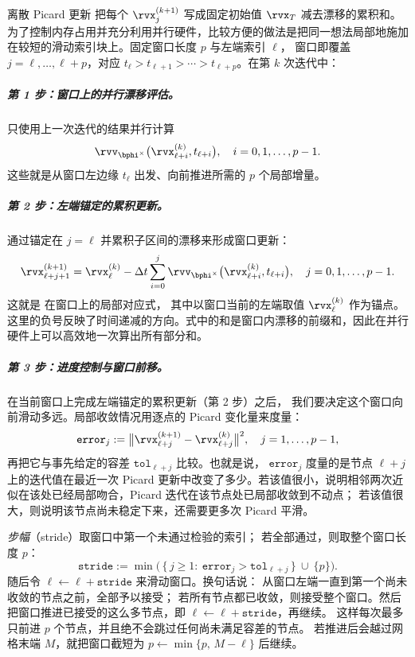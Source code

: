 离散 Picard 更新  把每个
$\rvx^{(k+1)}_j$ 写成固定初始值 $\rvx_T$ 减去漂移的累积和。
为了控制内存占用并充分利用并行硬件，比较方便的做法是把同一想法局部地施加在较短的滑动索引块上。固定窗口长度 $p$ 与左端索引 $\ell$，
窗口即覆盖 $j=\ell,\ldots,\ell+p$，对应
$t_\ell>t_{\ell+1}>\cdots>t_{\ell+p}$。在第 $k$ 次迭代中：

\subparagraph{第 1 步：窗口上的并行漂移评估。}
只使用上一次迭代的结果并行计算
\[
\rvv_{\bphi^\times} \big(\rvx^{(k)}_{\ell+i}, t_{\ell+i}\big),
\quad i=0,1,\ldots,p-1.
\]
这些就是从窗口左边缘 $t_\ell$ 出发、向前推进所需的 $p$ 个局部增量。

\subparagraph{第 2 步：左端锚定的累积更新。}
通过锚定在 $j=\ell$ 并累积子区间的漂移来形成窗口更新：
\begin{equation}\label{eq:window_update}
\rvx^{(k+1)}_{\ell+j+1}
 =
\rvx^{(k)}_{\ell}
 - \Delta t \sum_{i=0}^{j}
\rvv_{\bphi^\times} \big(\rvx^{(k)}_{\ell+i}, t_{\ell+i}\big),
\quad j=0,1,\ldots,p-1.
\end{equation}
这就是  在窗口上的局部对应式，
其中以窗口当前的左端取值 $\rvx^{(k)}_\ell$ 作为锚点。
这里的负号反映了时间递减的方向。式中的和是窗口内漂移的前缀和，因此在并行硬件上可以高效地一次算出所有部分和。

\subparagraph{第 3 步：进度控制与窗口前移。}
在当前窗口上完成左端锚定的累积更新（第 2 步）之后，
我们要决定这个窗口向前滑动多远。局部收敛情况用逐点的 Picard 变化量来度量：
\[
\mathtt{error}_j
:=
\big\|\rvx^{(k+1)}_{\ell+j}-\rvx^{(k)}_{\ell+j}\big\|^2,
\quad j=1,\ldots,p-1,
\]
再把它与事先给定的容差 $\mathtt{tol}_{\ell+j}$ 比较。也就是说，
$\mathtt{error}_j$ 度量的是节点 $\ell+j$ 上的迭代值在最近一次
Picard 更新中改变了多少。若该值很小，说明相邻两次近似在该处已经局部吻合，Picard 迭代在该节点处已局部收敛到不动点；
若该值很大，则说明该节点尚未稳定下来，还需要更多次 Picard 平滑。


\emph{步幅}（stride）取窗口中第一个未通过检验的索引；
若全部通过，则取整个窗口长度 $p$：
\[
\mathtt{stride}
:=
\min\Big(\,\{\,j\ge 1:\ \mathtt{error}_j>\mathtt{tol}_{\ell+j}\,\}\ \cup\ \{p\}\Big).
\]
随后令 $\ell \leftarrow \ell+\mathtt{stride}$ 来滑动窗口。换句话说：
从窗口左端一直到第一个尚未收敛的节点之前，全部予以接受；
若所有节点都已收敛，则接受整个窗口。然后把窗口推进已接受的这么多节点，即 $\ell \leftarrow \ell+\mathtt{stride}$，再继续。
这样每次最多只前进 $p$ 个节点，并且绝不会跳过任何尚未满足容差的节点。
若推进后会越过网格末端 $M$，就把窗口截短为
$p \leftarrow \min\{p,\,M-\ell\}$ 后继续。


